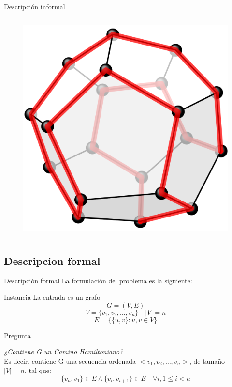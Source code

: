 \documentclass{beamer}
\begin{document}
\begin{frame}{Descripción informal}
\begin{columns}
\begin{figure}
            \includegraphics[scale=0.08]{images/icosaedro.png}
        \end{figure}
    \end{columns}
\end{frame}

\subsection{Descripcion formal}
\begin{frame}{Descripción formal}
    La formulación del problema es la siguiente:
    \begin{block}{Instancia}
        La entrada es un grafo: 
        \[G=(V, E)\]
        \[V = \{v_1, v_2, \dots, v_n\} \quad |V| = n\]
        \[E = \{\{u, v\} : u, v \in V\}\]
    \end{block}
    \begin{block}{Pregunta}
        \begin{center}
            \textit{¿Contiene G un Camino Hamiltoniano?}\\
            Es decir, contiene G una secuencia ordenada $\displaystyle <v_1, v_2, \dots, v_n>$, 
            de tamaño $|V| = n$, tal que:
            \[\{v_n, v_1\} \in E \land \{v_i, v_{i+1}\} \in E \quad \forall i, 1 \le i < n\]
        \end{center}
    \end{block}
\end{frame}
\end{document}
